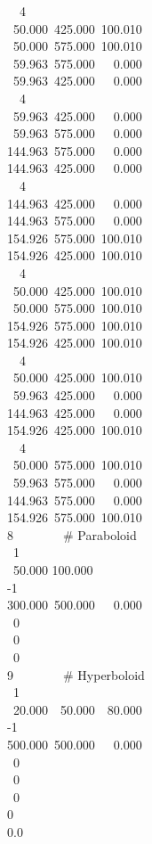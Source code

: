 ~~~4\\
~~50.000~425.000~100.010\\
~~50.000~575.000~100.010\\
~~59.963~575.000~~~0.000\\
~~59.963~425.000~~~0.000\\
~~~4\\
~~59.963~425.000~~~0.000\\
~~59.963~575.000~~~0.000\\
~144.963~575.000~~~0.000\\
~144.963~425.000~~~0.000\\
~~~4\\
~144.963~425.000~~~0.000\\
~144.963~575.000~~~0.000\\
~154.926~575.000~100.010\\
~154.926~425.000~100.010\\
~~~4\\
~~50.000~425.000~100.010\\
~~50.000~575.000~100.010\\
~154.926~575.000~100.010\\
~154.926~425.000~100.010\\
~~~4\\
~~50.000~425.000~100.010\\
~~59.963~425.000~~~0.000\\
~144.963~425.000~~~0.000\\
~154.926~425.000~100.010\\
~~~4\\
~~50.000~575.000~100.010\\
~~59.963~575.000~~~0.000\\
~144.963~575.000~~~0.000\\
~154.926~575.000~100.010\\
~8~~~~~~~~\# Paraboloid\\
~~1\\
~~50.000 100.000\\
~-1\\
~300.000~500.000~~~0.000\\
~~0\\
~~0\\
~~0\\
~9~~~~~~~~\# Hyperboloid\\
~~1\\
~~20.000~~50.000~~80.000\\
~-1\\
~500.000~500.000~~~0.000\\
~~0\\
~~0\\
~~0\\
~0\\
~0.0\\

